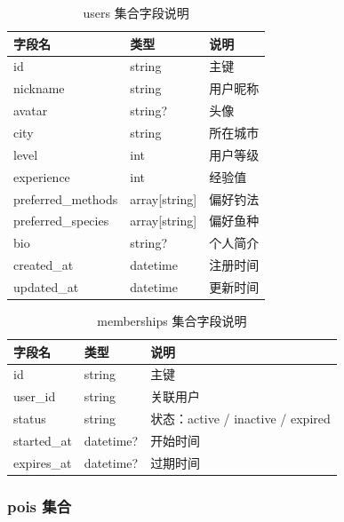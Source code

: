 \documentclass[12pt,a4paper]{ctexart}
\begin{document}
\begin{table}[H]
  \centering
  \caption{users 集合字段说明}
  \label{tab:users-schema}
  \begin{tabular}{p{3.5cm}p{2cm}p{6.5cm}}
    \toprule
    \textbf{字段名} & \textbf{类型} & \textbf{说明} \\
    \midrule
    id & string & 主键 \\
    nickname & string & 用户昵称 \\
    avatar & string? & 头像 \\
    city & string & 所在城市 \\
    level & int & 用户等级 \\
    experience & int & 经验值 \\
    preferred\_methods & array[string] & 偏好钓法 \\
    preferred\_species & array[string] & 偏好鱼种 \\
    bio & string? & 个人简介 \\
    created\_at & datetime & 注册时间 \\
    updated\_at & datetime & 更新时间 \\
    \bottomrule
  \end{tabular}
\end{table}

\begin{table}[H]
  \centering
  \caption{memberships 集合字段说明}
  \label{tab:memberships-schema}
  \begin{tabular}{p{3.5cm}p{2cm}p{6.5cm}}
    \toprule
    \textbf{字段名} & \textbf{类型} & \textbf{说明} \\
    \midrule
    id & string & 主键 \\
    user\_id & string & 关联用户 \\
    status & string & 状态：active / inactive / expired \\
    started\_at & datetime? & 开始时间 \\
    expires\_at & datetime? & 过期时间 \\
    \bottomrule
  \end{tabular}
\end{table}

\subsubsection{pois 集合}
\end{document}
